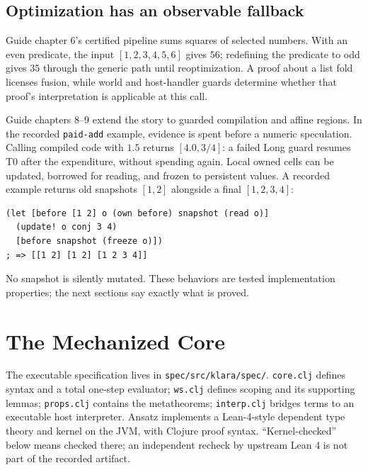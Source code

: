 \documentclass[acmsmall,screen,review,nonacm]{acmart}
\newcommand{\src}[1]{{\normalfont\nolinkurl{#1}}}
\begin{document}
\subsection{Optimization has an observable fallback}
Guide chapter 6's certified pipeline sums squares of selected numbers. With an
even predicate, the input $[1,2,3,4,5,6]$ gives $56$; redefining the predicate to
odd gives $35$ through the generic path until reoptimization. A proof about a
list fold licenses fusion, while world and host-handler guards determine
whether that proof's interpretation is applicable at this call.

Guide chapters 8--9 extend the story to guarded compilation and affine regions.
In the recorded \src{paid-add} example, evidence is spent before a numeric
speculation. Calling compiled code with $1.5$ returns $[4.0,3/4]$: a failed
Long guard resumes T0 after the expenditure, without spending again. Local
owned cells can be updated, borrowed for reading, and frozen to persistent
values. A recorded example returns old snapshots $[1,2]$ alongside a final
$[1,2,3,4]$:
\begin{lstlisting}
(let [before [1 2] o (own before) snapshot (read o)]
  (update! o conj 3 4)
  [before snapshot (freeze o)])
; => [[1 2] [1 2] [1 2 3 4]]
\end{lstlisting}
No snapshot is silently mutated. These behaviors are tested implementation
properties; the next sections say exactly what is proved.

\section{The Mechanized Core}\label{sec:core}
The executable specification lives in \src{spec/src/klara/spec/}.
\src{core.clj} defines syntax and a total one-step evaluator; \src{ws.clj}
defines scoping and its supporting lemmas; \src{props.clj} contains the
metatheorems; \src{interp.clj} bridges terms to an executable host interpreter.
Ansatz implements a Lean-4-style dependent type theory and kernel on the JVM,
with Clojure proof syntax. ``Kernel-checked'' below means checked there; an
independent recheck by upstream Lean 4 is not part of the recorded artifact.
\end{document}
